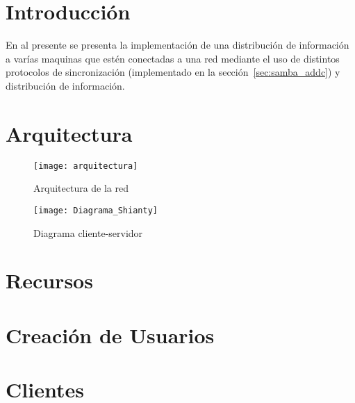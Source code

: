 \documentclass[letterpaper]{article}
\begin{document}


\tableofcontents
{}


\newpage


\section{Introducción}\label{sec:introduccion}
En al presente se presenta la implementación de una distribución de información
a varías maquinas que estén conectadas a una red mediante el uso de distintos
protocolos de sincronización (implementado en la sección~\ref{sec:samba_addc})
y distribución de información.


\section{Arquitectura}\label{sec:arq}
\begin{figure}[h!]
  \texttt{[image: arquitectura]}
  \caption{Arquitectura de la red}\label{fig:arquitectura}
\end{figure}

\begin{figure}[h!]
  \texttt{[image: Diagrama\_Shianty]}
  \caption{Diagrama cliente-servidor}\label{fig:dia_c_s}
\end{figure}



\section{Recursos}\label{sec:recursos}



\clearpage{}

\section{Creación de Usuarios}\label{sec:cusuarios}



\clearpage{}

\section{Clientes}\label{sec:clientes}



\newpage

\listoffigures
{}
\listoflistings{}
\newpage{}
\printglossary{}
\printglossary[type=\acronymtype]
\end{document}
